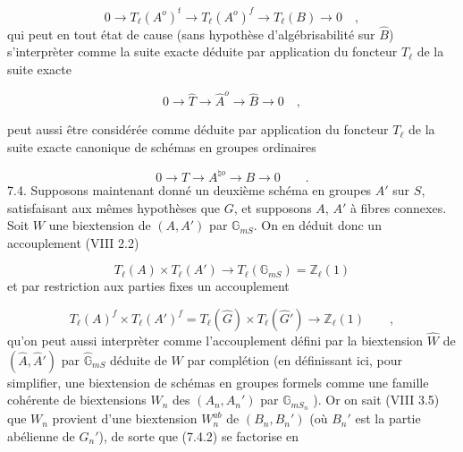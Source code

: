 \begin{equation}\tag{7.3.6}
0 \longrightarrow T_{\ell}(A^{o})^{t} \longrightarrow T_{\ell}(A^{o})^{f} \longrightarrow T_{\ell}(B) \longrightarrow 0 \quad ,
\end{equation}
qui peut en tout état de cause (sans hypothèse d'algébrisabilité sur $\hat{B}$) s'interprèter comme la suite exacte déduite par application du foncteur $T_{\ell}$ de la suite exacte

\begin{equation*}
0 \longrightarrow \hat{T} \longrightarrow \hat{A}^{o} \longrightarrow \hat{B} \longrightarrow 0 \quad ,
\end{equation*}


peut aussi être considérée comme déduite par application du foncteur $T_{\ell}$ de la suite exacte canonique de schémas en groupes ordinaires

\begin{equation*}
0 \longrightarrow T \longrightarrow A^{\natural o} \longrightarrow B \longrightarrow 0 \qquad .
\end{equation*}
7.4. Supposons maintenant donné un deuxième schéma en groupes $A'$ sur $S$, satisfaisant aux mêmes hypothèses que $G$, et supposons $A$, $A'$ à fibres connexes. Soit $W$ une biextension de $(A,A')$ par $\mathbb{G}_{mS}$. On en déduit donc un accouplement (VIII 2.2)

\begin{equation}\tag{7.4.1}
T_{\ell}(A) \times T_{\ell}(A') \longrightarrow T_{\ell}(\mathbb{G}_{mS}) = \mathbb{Z}_{\ell}(1)
\end{equation}
et par restriction aux parties fixes un accouplement

\begin{equation}\tag{7.4.2}
T_{\ell}(A)^{f} \times T_{\ell}(A')^{f} = T_{\ell}(\hat{G}) \times T_{\ell}(\hat{G}') \longrightarrow \mathbb{Z}_{\ell}(1) \qquad ,
\end{equation}
qu'on peut aussi interprèter comme l'accouplement défini par la biextension $\hat{W}$ de $(\hat{A},\hat{A}')$ par $\hat{\mathbb{G}}_{mS}$ déduite de $W$ par complétion (en définissant ici, pour simplifier, une biextension de schémas en groupes formels comme une famille cohérente de biextensions $W_{n}$ des $(A_{n},A_{n}')$ par $\mathbb{G}_{mS_{n}}$ ). Or on sait (VIII 3.5) que $W_{n}$ provient d'une biextension $W_{n}^{ab}$ de $(B_{n},B_{n}')$ (où $B_{n}'$ est la partie abélienne de $G_{n}'$), de sorte que (7.4.2) se factorise en


